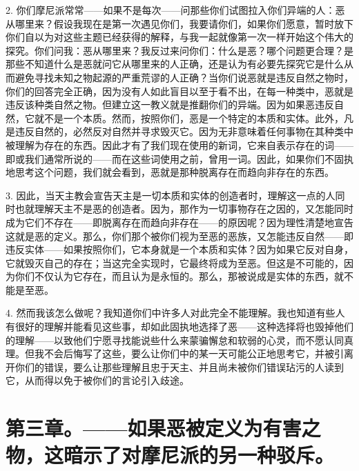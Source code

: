 2. 你们摩尼派常常——如果不是每次——问那些你们试图拉入你们异端的人：恶从哪里来？假设我现在是第一次遇见你们，我要请你们，如果你们愿意，暂时放下你们自以为对这些主题已经获得的解释，与我一起就像第一次一样开始这个伟大的探究。你们问我：恶从哪里来？我反过来问你们：什么是恶？哪个问题更合理？是那些不知道什么是恶就问它从哪里来的人正确，还是认为有必要先探究它是什么从而避免寻找未知之物起源的严重荒谬的人正确？当你们说恶就是违反自然之物时，你们的回答完全正确，因为没有人如此盲目以至于看不出，在每一种类中，恶就是违反该种类自然之物。但建立这一教义就是推翻你们的异端。因为如果恶违反自然，它就不是一个本质。然而，按照你们，恶是一个特定的本质和实体。此外，凡是违反自然的，必然反对自然并寻求毁灭它。因为无非意味着任何事物在其种类中被理解为存在的东西。因此才有了我们现在使用的新词，它来自表示存在的词——即或我们通常所说的——而在这些词使用之前，曾用一词。因此，如果你们不固执地思考这个问题，我们就会看到，恶就是那种脱离存在而趋向非存在的东西。\par

3. 因此，当天主教会宣告天主是一切本质和实体的创造者时，理解这一点的人同时也就理解天主不是恶的创造者。因为，那作为一切事物存在之因的，又怎能同时成为它们不存在——即脱离存在而趋向非存在——的原因呢？因为理性清楚地宣告这就是恶的定义。那么，你们那个被你们视为至恶的恶族，又怎能违反自然——即违反实体——如果按照你们，它本身就是一个本质和实体？因为如果它反对自身，它就毁灭自己的存在；当这完全实现时，它最终将成为至恶。但这是不可能的，因为你们不仅认为它存在，而且认为是永恒的。那么，那被说成是实体的东西，就不能是至恶。\par

4. 然而我该怎么做呢？我知道你们中许多人对此完全不能理解。我也知道有些人有很好的理解并能看见这些事，却如此固执地选择了恶——这种选择将也毁掉他们的理解——以致他们宁愿寻找能说些什么来蒙骗懈怠和软弱的心灵，而不愿认同真理。但我不会后悔写了这些，要么让你们中的某一天可能公正地思考它，并被引离开你们的错误，要么让那些理解且忠于天主、并且尚未被你们错误玷污的人读到它，从而得以免于被你们的言论引入歧途。\par


\section{第三章。——如果恶被定义为有害之物，这暗示了对摩尼派的另一种驳斥。}

